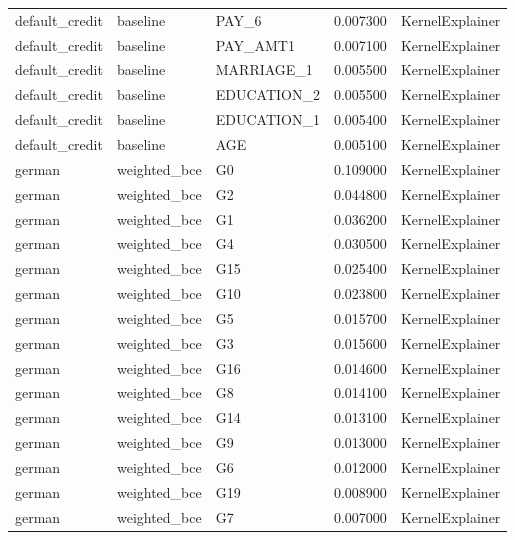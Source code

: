 \begin{tabular}{lllrl}
default_credit & baseline & PAY_6 & 0.007300 & KernelExplainer \\
default_credit & baseline & PAY_AMT1 & 0.007100 & KernelExplainer \\
default_credit & baseline & MARRIAGE_1 & 0.005500 & KernelExplainer \\
default_credit & baseline & EDUCATION_2 & 0.005500 & KernelExplainer \\
default_credit & baseline & EDUCATION_1 & 0.005400 & KernelExplainer \\
default_credit & baseline & AGE & 0.005100 & KernelExplainer \\
german & weighted_bce & G0 & 0.109000 & KernelExplainer \\
german & weighted_bce & G2 & 0.044800 & KernelExplainer \\
german & weighted_bce & G1 & 0.036200 & KernelExplainer \\
german & weighted_bce & G4 & 0.030500 & KernelExplainer \\
german & weighted_bce & G15 & 0.025400 & KernelExplainer \\
german & weighted_bce & G10 & 0.023800 & KernelExplainer \\
german & weighted_bce & G5 & 0.015700 & KernelExplainer \\
german & weighted_bce & G3 & 0.015600 & KernelExplainer \\
german & weighted_bce & G16 & 0.014600 & KernelExplainer \\
german & weighted_bce & G8 & 0.014100 & KernelExplainer \\
german & weighted_bce & G14 & 0.013100 & KernelExplainer \\
german & weighted_bce & G9 & 0.013000 & KernelExplainer \\
german & weighted_bce & G6 & 0.012000 & KernelExplainer \\
german & weighted_bce & G19 & 0.008900 & KernelExplainer \\
german & weighted_bce & G7 & 0.007000 & KernelExplainer \\
\bottomrule
\end{tabular}
